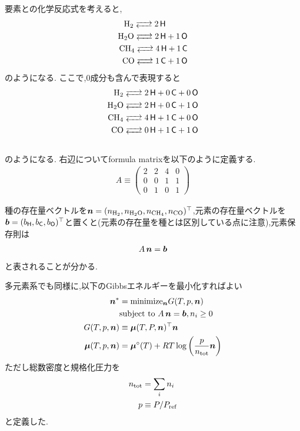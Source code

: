 要素との化学反応式を考えると,
\begin{align*}
\ce{H2 <--> 2 $\Hel$ \, \, \, \, \, \, \, \, \\
H2O <--> 2 $\Hel$ + 1 $\Oel$ \\
CH4 <--> 4 $\Hel$ + 1 $\Cel$ \\
CO <-->  1 $\Cel$ + 1 $\Oel$
}
\end{align*}
のようになる. ここで,0成分も含んで表現すると
\begin{align*}
\ce{H2 <--> 2 $\Hel$ + 0 $\Cel$ + 0 $\Oel$ \\
H2O <--> 2 $\Hel$ + 0 $\Cel$ + 1 $\Oel$ \\
CH4 <--> 4 $\Hel$ + 1 $\Cel$ + 0 $\Oel$ \\
CO <--> 0 $\Hel$ + 1 $\Cel$ + 1 $\Oel$ \\ 
}
\end{align*}
のようになる. 右辺についてformula matrixを以下のように定義する. 
\begin{align*}
  A \equiv
\begin{pmatrix} 
2 & 2 & 4 & 0 \\
0 & 0 & 1 & 1 \\
0 & 1 & 0 & 1 
\end{pmatrix}  
\end{align*}

種の存在量ベクトルを$\boldsymbol{n} = (n_\mathrm{H_2}, n_\mathrm{H_2 O},n_\mathrm{C H_4},n_\mathrm{CO})^\top$,元素の存在量ベクトルを$\boldsymbol{b} = (b_{\mathsf{H}}, b_{\mathsf{C}}, b_{\mathsf{O}})^\top$と置くと(元素の存在量を種とは区別している点に注意),元素保存則は
\begin{align}
    A \, \boldsymbol{n} = \boldsymbol{b} 
\end{align}
と表されることが分かる. 


多元素系でも同様に,以下のGibbsエネルギーを最小化すればよい
\begin{align}
\label{eq:gibss_multi}
    \boldsymbol{n}^\ast &= \mathrm{minimize}_{\boldsymbol{n}} G(T, p, \boldsymbol{n}) \nonumber \\
    &\mbox{subject to} \,\, A \, \boldsymbol{n} = \boldsymbol{b}, n_i \ge 0\\
    G(T, p, \boldsymbol{n}) &\equiv  \boldsymbol{\mu} (T, P, \boldsymbol{n})^\top \boldsymbol{n}\\ 
    \label{eq:chemical_potential_mu}
    \boldsymbol{\mu} (T, p, \boldsymbol{n}) &=  \boldsymbol{\mu}^\circ(T) + RT \log{\left(\frac{p}{n_\mathrm{tot}} \boldsymbol{n}\right)} 
\end{align}
ただし総数密度と規格化圧力を
\begin{align}
\label{eq:ntot_tce}
    n_\mathrm{tot} &= \sum_i n_i \\
    p &\equiv P/P_\mathrm{ref}
\end{align}
と定義した. 

